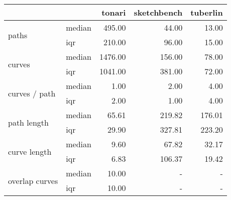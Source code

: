 \begin{tabular}{llrrr}
\toprule
 &  & tonari & sketchbench & tuberlin \\
\midrule
\multirow[t]{2}{*}{paths} & median & 495.00 & 44.00 & 13.00 \\
 & \acrshort{iqr} & 210.00 & 96.00 & 15.00 \\
\cline{1-5}
\multirow[t]{2}{*}{curves} & median & 1476.00 & 156.00 & 78.00 \\
 & \acrshort{iqr} & 1041.00 & 381.00 & 72.00 \\
\cline{1-5}
\multirow[t]{2}{*}{curves / path} & median & 1.00 & 2.00 & 4.00 \\
 & \acrshort{iqr} & 2.00 & 1.00 & 4.00 \\
\cline{1-5}
\multirow[t]{2}{*}{path length} & median & 65.61 & 219.82 & 176.01 \\
 & \acrshort{iqr} & 29.90 & 327.81 & 223.20 \\
\cline{1-5}
\multirow[t]{2}{*}{curve length} & median & 9.60 & 67.82 & 32.17 \\
 & \acrshort{iqr} & 6.83 & 106.37 & 19.42 \\
\cline{1-5}
\multirow[t]{2}{*}{overlap curves} & median & 10.00 & - & - \\
 & \acrshort{iqr} & 10.00 & - & - \\
\cline{1-5}
\bottomrule
\end{tabular}
